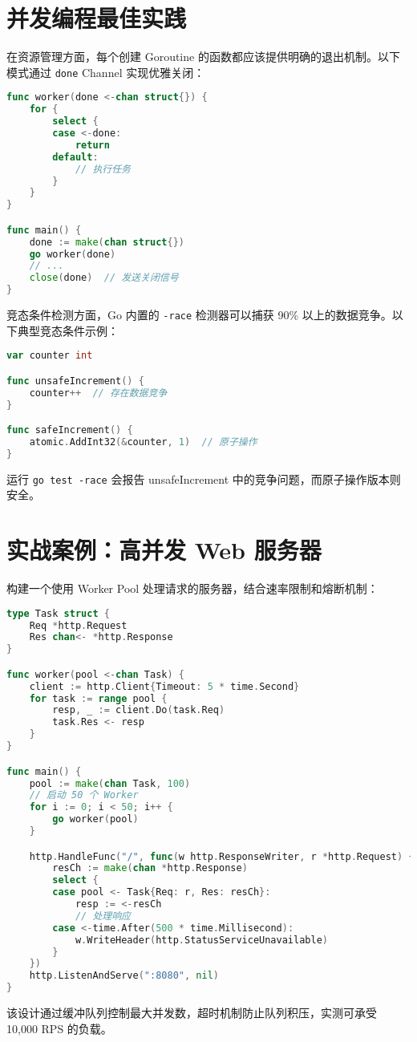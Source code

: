 \chapter{并发编程最佳实践}
在资源管理方面，每个创建 Goroutine 的函数都应该提供明确的退出机制。以下模式通过 \verb!done! Channel 实现优雅关闭：\par
\begin{lstlisting}[language=go]
func worker(done <-chan struct{}) {
    for {
        select {
        case <-done:
            return
        default:
            // 执行任务
        }
    }
}

func main() {
    done := make(chan struct{})
    go worker(done)
    // ... 
    close(done)  // 发送关闭信号
}
\end{lstlisting}
竞态条件检测方面，Go 内置的 \verb!-race! 检测器可以捕获 90\%{} 以上的数据竞争。以下典型竞态条件示例：\par
\begin{lstlisting}[language=go]
var counter int

func unsafeIncrement() {
    counter++  // 存在数据竞争
}

func safeIncrement() {
    atomic.AddInt32(&counter, 1)  // 原子操作
}
\end{lstlisting}
运行 \verb!go test -race! 会报告 unsafeIncrement 中的竞争问题，而原子操作版本则安全。\par
\chapter{实战案例：高并发 Web 服务器}
构建一个使用 Worker Pool 处理请求的服务器，结合速率限制和熔断机制：\par
\begin{lstlisting}[language=go]
type Task struct {
    Req *http.Request
    Res chan<- *http.Response
}

func worker(pool <-chan Task) {
    client := http.Client{Timeout: 5 * time.Second}
    for task := range pool {
        resp, _ := client.Do(task.Req)
        task.Res <- resp
    }
}

func main() {
    pool := make(chan Task, 100)
    // 启动 50 个 Worker
    for i := 0; i < 50; i++ {
        go worker(pool)
    }

    http.HandleFunc("/", func(w http.ResponseWriter, r *http.Request) {
        resCh := make(chan *http.Response)
        select {
        case pool <- Task{Req: r, Res: resCh}:
            resp := <-resCh
            // 处理响应
        case <-time.After(500 * time.Millisecond):
            w.WriteHeader(http.StatusServiceUnavailable)
        }
    })
    http.ListenAndServe(":8080", nil)
}
\end{lstlisting}
该设计通过缓冲队列控制最大并发数，超时机制防止队列积压，实测可承受 10,000 RPS 的负载。\par
